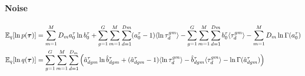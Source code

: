 \paragraph*{Noise}

\begin{equation} \begin{aligned}
	\mathbb{E}_q [\ln p(\mbox{\boldmath $\tau$})] &= \sum_{m=1}^{M} D_m a_0^\tau \ln b_0^\tau + \sum_{g=1}^{G}\sum_{m=1}^{M}\sum_{d=1}^{Dm} (a_0^\tau - 1) \langle \ln \tau_d^{gm} \rangle - \sum_{g=1}^{G}\sum_{m=1}^{M}\sum_{d=1}^{Dm} b_0^\tau \langle \tau_d^{gm} \rangle - \sum_{m=1}^{M} D_m \ln \Gamma(a_0^\tau)\\
	\mathbb{E}_q [\ln q(\mbox{\boldmath $\tau$})] &= \sum_{g=1}^{G} \sum_{m=1}^{M} \sum_{d=1}^{D_m} \left( \hat{a}_{dgm}^\tau \ln \hat{b}_{dgm}^\tau + (\hat{a}_{dgm}^\tau - 1) \langle \ln \tau_d^{gm} \rangle - \hat{b}_{dgm}^\tau \langle \tau_d^{gm} \rangle - \ln \Gamma(\hat{a}_{dgm}^\tau) \right)
\end{aligned} \end{equation}
